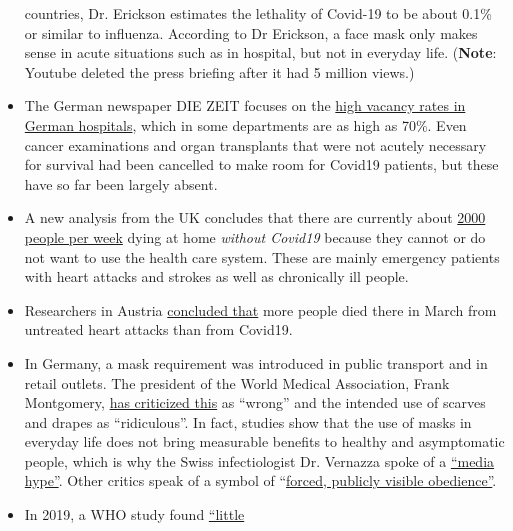 \begin{itemize}
  countries, Dr. Erickson estimates the lethality of Covid-19 to be
  about 0.1\% or similar to influenza. According to Dr Erickson, a face
  mask only makes sense in acute situations such as in hospital, but not
  in everyday life. (\textbf{Note}: Youtube deleted the press briefing
  after it had 5 million views.)
\item
  The German newspaper DIE ZEIT focuses on the
  \href{https://www.zeit.de/2020/18/kliniken-coronavirus-intensivbetten-patienten-behandlung-notaufnahme}{high
  vacancy rates in German hospitals}, which in some departments are as
  high as 70\%. Even cancer examinations and organ transplants that were
  not acutely necessary for survival had been cancelled to make room for
  Covid19 patients, but these have so far been largely absent.
\item
  A new analysis from the UK concludes that there are currently about
  \href{https://www.telegraph.co.uk/global-health/science-and-disease/two-new-waves-deaths-break-nhs-new-analysis-warns/}{2000
  people per week} dying at home \emph{without Covid19} because they
  cannot or do not want to use the health care system. These are mainly
  emergency patients with heart attacks and strokes as well as
  chronically ill people.
\item
  Researchers in Austria
  \href{https://academic.oup.com/eurheartj/advance-article/doi/10.1093/eurheartj/ehaa314/5820829}{concluded
  that} more people died there in March from untreated heart attacks
  than from Covid19.
\item
  In Germany, a mask requirement was introduced in public transport and
  in retail outlets. The president of the World Medical Association,
  Frank Montgomery,
  \href{https://www.aerztezeitung.de/Politik/Montgomery-haelt-Maskenpflicht-fuer-falsch-408844.html}{has
  criticized this} as ``wrong'' and the intended use of scarves and
  drapes as ``ridiculous''. In fact, studies show that the use of masks
  in everyday life does not bring measurable benefits to healthy and
  asymptomatic people, which is why the Swiss infectiologist Dr.
  Vernazza spoke of a
  \href{https://infekt.ch/2020/04/atemschutzmasken-fuer-alle-medienhype-oder-unverzichtbar/}{``media
  hype''}. Other critics speak of a symbol of
  ``\href{https://multipolar-magazin.de/artikel/maskenpflicht-gesellschaftliches-klima}{forced,
  publicly visible obedience''}.
\item
  In 2019, a WHO study found
  \href{https://www.heise.de/tp/features/COVID-19-WHO-Studie-findet-kaum-Belege-fuer-die-Wirksamkeit-von-Eindaemmungsmassnahmen-4706446.html}{``little
}
\end{itemize}

